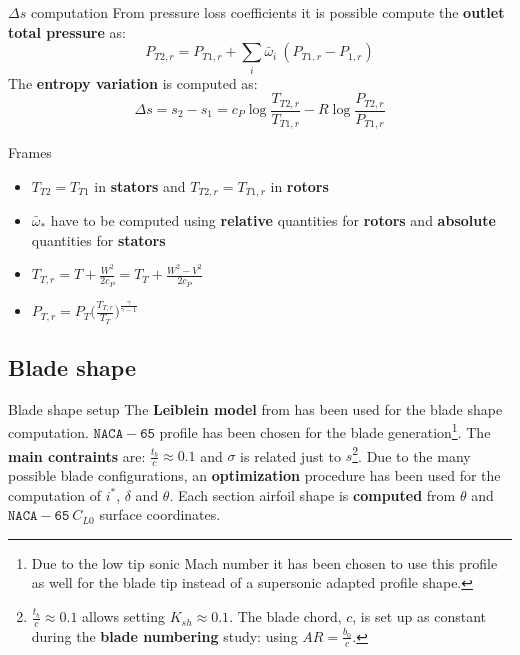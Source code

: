 	\begin{frame}{$\Delta s$ computation}
		From pressure loss coefficients it is possible compute the \textbf{outlet total pressure} as: 
		\begin{equation}
			P_{T2,r} = P_{T1,r} + \sum_i \bar{\omega}_{i} \ (P_{T1,r} - P_{1,r}) \nonumber
		\end{equation}
		The \textbf{entropy variation} is computed as: 
		\begin{equation}
			\Delta s = s_2 - s_1 = c_P \log{\frac{T_{T2,r}}{T_{T1,r}}} - R \log{\frac{P_{T2,r}}{P_{T1,r}}} \nonumber
		\end{equation}
		\vspace{-0.5cm}
		\begin{alertblock}{Frames}
			\begin{itemize}
				\item $T_{T2} = T_{T1}$ in \textbf{stators} and $T_{T2,r} = T_{T1,r}$ in \textbf{rotors}
				\item $\bar{\omega}_{*}$ have to be computed using \textbf{relative} quantities for \textbf{rotors} and \textbf{absolute} quantities for \textbf{stators}
				\item $T_{T,r} = T + \frac{W^2}{2 c_P} = T_T + \frac{W^2 - V^2}{2 c_P}$
				\item $P_{T,r} = P_T \Big( \frac{T_{T,r}}{T_T} \Big)^{\frac{\gamma}{\gamma - 1}}$
			\end{itemize}
		\end{alertblock}
	\end{frame}
	
\subsection{Blade shape}
	{\nologo
	\begin{frame}{Blade shape setup}
		The \textbf{Leiblein model} from \cite[Ch. 6]{axial2004} has been used for the blade shape computation. 
		\newline 
		\newline
		$\mathtt{NACA-65}$ profile has been chosen for the blade generation\footnote{Due to the low tip sonic Mach number it has been chosen to use this profile as well for the blade tip instead of a supersonic adapted profile shape.}.
		\newline
		\newline
		The \textbf{main contraints} are: $\frac{t_b}{c} \approx 0.1$ and $\sigma$ is related just to $s$\footnote{$\frac{t_b}{c} \approx 0.1$ allows setting $K_{sh} \approx 0.1$. The blade chord, $c$, is set up as constant during the \textbf{blade numbering} study: using $AR = \frac{b_0}{c}$.}.
		\newline
		\newline
		Due to the many possible blade configurations, an \textbf{optimization} procedure has been used for the computation of $i^{*}$, $\delta$ and $\theta$. 
		\newline
		\newline
		Each section airfoil shape is \textbf{computed} from $\theta$ and $\mathtt{NACA-65} \ C_{L0}$ surface coordinates.
	\end{frame}
	}

